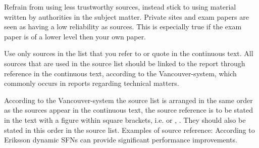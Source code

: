 Refrain from using less trustworthy sources, instead stick to using material written by authorities in the subject matter. Private sites and exam papers are seen as having a low reliability as sources. This is especially true if the exam paper is of a lower level then your own paper.

Use only sources in the list that you refer to or quote in the continuous text. All sources that are used in the source list should be linked to the report through reference in the continuous text, according to the Vancouver-system, which commonly occurs in reports regarding technical matters.

According to the Vancouver-system the source list is arranged in the same order as the sources appear in the continuous text, the source reference is to be stated in the text with a figure within square brackets, i.e. or , . They should also be stated in this order in the source list. Examples of source reference: According to Eriksson   dynamic SFNs can provide significant performance improvements.
